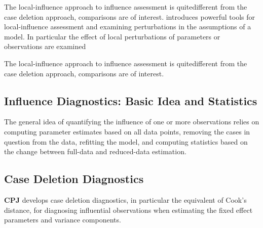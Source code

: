 \documentclass[Main.tex]{subfiles}
\begin{document}
The local-influence approach to influence assessment is quitedifferent from the case deletion approach, comparisons are of
interest.
	\citet{cook86} introduces powerful tools for local-influence assessment and examining perturbations in the assumptions of a model. In particular the effect of local perturbations of parameters or observations are examined	
	

	
	The local-influence approach to influence assessment is quitedifferent from the case deletion approach, comparisons are of
	interest.
	
	
	
	\subsection{Influence Diagnostics: Basic Idea and Statistics} %
	
	The general idea of quantifying the influence of one or more observations relies on computing parameter estimates based on all data points, removing the cases in question from the data, refitting the model, and computing statistics based on the change between full-data and reduced-data estimation. 
	

	\subsection{Case Deletion Diagnostics} %
	
	\textbf{CPJ} develops  case deletion diagnostics, in particular the equivalent of  Cook's distance, for diagnosing influential observations when estimating the fixed effect parameters and variance components.
	
\end{document}
